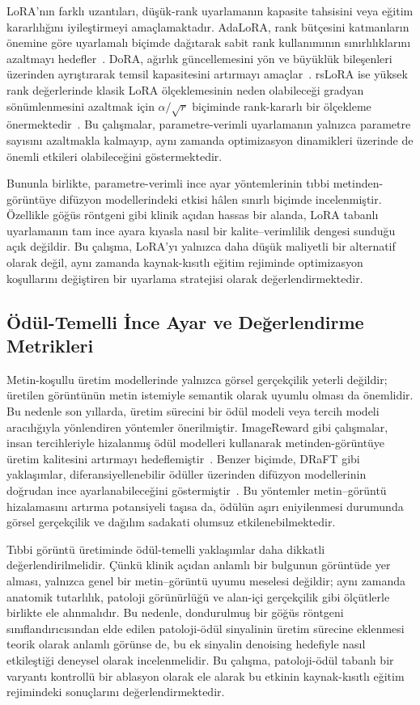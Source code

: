 \documentclass[11pt]{article}
\begin{document}
LoRA'nın farklı uzantıları, düşük-rank uyarlamanın kapasite tahsisini veya
eğitim kararlılığını iyileştirmeyi amaçlamaktadır. AdaLoRA, rank bütçesini
katmanların önemine göre uyarlamalı biçimde dağıtarak sabit rank kullanımının
sınırlılıklarını azaltmayı hedefler~\cite{adalora}. DoRA, ağırlık güncellemesini
yön ve büyüklük bileşenleri üzerinden ayrıştırarak temsil kapasitesini
artırmayı amaçlar~\cite{dora}. rsLoRA ise yüksek rank değerlerinde klasik
LoRA ölçeklemesinin neden olabileceği gradyan sönümlenmesini azaltmak için
$\alpha/\sqrt{r}$ biçiminde rank-kararlı bir ölçekleme önermektedir~\cite{rslora}.
Bu çalışmalar, parametre-verimli uyarlamanın yalnızca parametre sayısını
azaltmakla kalmayıp, aynı zamanda optimizasyon dinamikleri üzerinde de önemli
etkileri olabileceğini göstermektedir.

Bununla birlikte, parametre-verimli ince ayar yöntemlerinin tıbbi
metinden-görüntüye difüzyon modellerindeki etkisi hâlen sınırlı biçimde
incelenmiştir. Özellikle göğüs röntgeni gibi klinik açıdan hassas bir alanda,
LoRA tabanlı uyarlamanın tam ince ayara kıyasla nasıl bir kalite--verimlilik
dengesi sunduğu açık değildir. Bu çalışma, LoRA'yı yalnızca daha düşük maliyetli
bir alternatif olarak değil, aynı zamanda kaynak-kısıtlı eğitim rejiminde
optimizasyon koşullarını değiştiren bir uyarlama stratejisi olarak
değerlendirmektedir.

\subsection{Ödül-Temelli İnce Ayar ve Değerlendirme Metrikleri}

Metin-koşullu üretim modellerinde yalnızca görsel gerçekçilik yeterli değildir;
üretilen görüntünün metin istemiyle semantik olarak uyumlu olması da önemlidir.
Bu nedenle son yıllarda, üretim sürecini bir ödül modeli veya tercih modeli
aracılığıyla yönlendiren yöntemler önerilmiştir. ImageReward gibi çalışmalar,
insan tercihleriyle hizalanmış ödül modelleri kullanarak metinden-görüntüye
üretim kalitesini artırmayı hedeflemiştir~\cite{imagereward}. Benzer biçimde,
DRaFT gibi yaklaşımlar, diferansiyellenebilir ödüller üzerinden difüzyon
modellerinin doğrudan ince ayarlanabileceğini göstermiştir~\cite{draft}.
Bu yöntemler metin--görüntü hizalamasını artırma potansiyeli taşısa da,
ödülün aşırı eniyilenmesi durumunda görsel gerçekçilik ve dağılım sadakati
olumsuz etkilenebilmektedir.

Tıbbi görüntü üretiminde ödül-temelli yaklaşımlar daha dikkatli
değerlendirilmelidir. Çünkü klinik açıdan anlamlı bir bulgunun görüntüde
yer alması, yalnızca genel bir metin--görüntü uyumu meselesi değildir; aynı
zamanda anatomik tutarlılık, patoloji görünürlüğü ve alan-içi gerçekçilik gibi
ölçütlerle birlikte ele alınmalıdır. Bu nedenle, dondurulmuş bir göğüs röntgeni
sınıflandırıcısından elde edilen patoloji-ödül sinyalinin üretim sürecine
eklenmesi teorik olarak anlamlı görünse de, bu ek sinyalin denoising hedefiyle
nasıl etkileştiği deneysel olarak incelenmelidir. Bu çalışma, patoloji-ödül
tabanlı bir varyantı kontrollü bir ablasyon olarak ele alarak bu etkinin
kaynak-kısıtlı eğitim rejimindeki sonuçlarını değerlendirmektedir.
\end{document}
